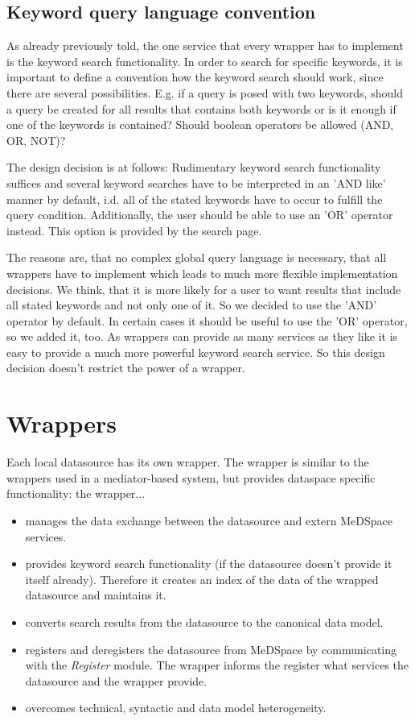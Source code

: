 \subsection{Keyword query language convention}
As already previously told, the one service that every wrapper has to implement is the keyword search functionality. In order to search for specific keywords, it is important to define a convention how the keyword search should work, since there are several possibilities. E.g. if a query is posed with two keywords, should a query be created for all results that contains both keywords or is it enough if one of the keywords is contained? Should boolean operators be allowed (AND, OR, NOT)? 

The design decision is at follows: Rudimentary keyword search functionality suffices and several keyword searches have to be interpreted in an 'AND like' manner by default, i.d. all of the stated keywords have to occur to fulfill the query condition. Additionally, the user should be able to use an 'OR' operator instead. This option is provided by the search page.

The reasons are, that no complex global query language is necessary, that all wrappers have to implement which leads to much more flexible implementation decisions. 
We think, that it is more likely for a user to want results that include all stated keywords and not only one of it. So we decided to use the 'AND' operator by default. In certain cases it should be useful to use the 'OR' operator, so we added it, too.
As wrappers can provide as many services as they like it is easy to provide a much more powerful keyword search service. So this design decision doesn't restrict the power of a wrapper.


\section{Wrappers}
Each local datasource has its own wrapper. The wrapper is similar to the wrappers used in a mediator-based system, but provides dataspace specific functionality: the wrapper...
\begin{itemize}
	\item manages the data exchange between the datasource and extern MeDSpace services.
	\item provides keyword search functionality (if the datasource doesn't provide it itself already). Therefore it creates an index of the data of the wrapped datasource and maintains it. 	
	\item converts search results from the datasource to the canonical data model.
	\item registers and deregisters the datasource from MeDSpace by communicating with the \emph{Register} module. The wrapper informs the register what services the datasource and the wrapper provide.
	\item overcomes technical, syntactic and data model heterogeneity. 
\end{itemize}

